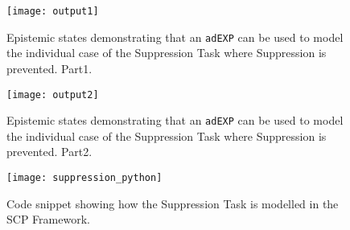 \begin{figure}
\centering \texttt{[image: output1]}
\caption{Epistemic states demonstrating that an \texttt{adEXP} can be used to model the individual case of the Suppression Task where Suppression is prevented. Part1.}
\label{fig:suppression_python}
\end{figure}
\begin{figure}
\centering \texttt{[image: output2]}
\caption{Epistemic states demonstrating that an \texttt{adEXP} can be used to model the individual case of the Suppression Task where Suppression is prevented. Part2.}
\label{fig:suppression_python2}
\end{figure}

\begin{figure}
\centering \texttt{[image: suppression\_python]}
\caption{Code snippet showing how the Suppression Task is modelled in the SCP Framework.}
\label{fig:sup_snippet}
\end{figure}

